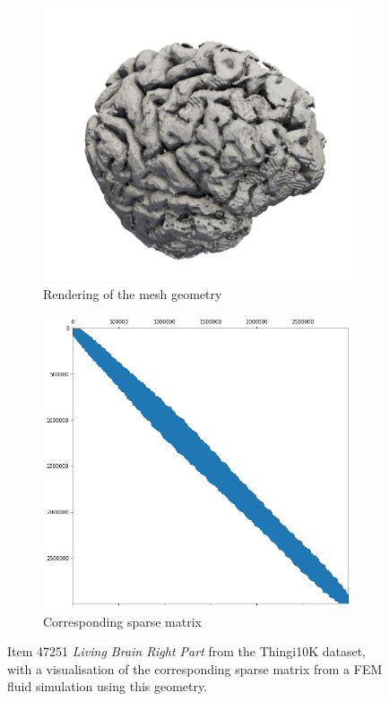 \documentclass{svproc}
\begin{document}
\begin{figure}
    \centering
  \begin{subfigure}{.5\textwidth}
  \centering
    \includegraphics[width=0.8\linewidth]{images/brain2.pdf}
  \caption{Rendering of the mesh geometry}
  \label{fig:rendering-mesh-geom}
\end{subfigure}%
\begin{subfigure}{.5\textwidth}
  \centering
  \includegraphics[width=.9\linewidth]{images/sparse-matrix.png}
  \caption{Corresponding sparse matrix }
  \label{fig:sparse-matrix-of-brain}
\end{subfigure}
\caption{Item 47251 \textit{Living Brain Right Part} from the Thingi10K dataset, with a visualisation of the corresponding sparse matrix from a FEM fluid simulation using this geometry.}
\label{fig:data-viz} 
\end{figure}
\end{document}
